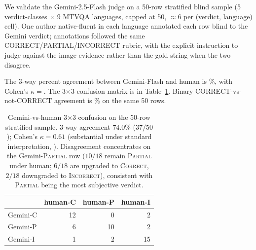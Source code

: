 We validate the Gemini-2.5-Flash judge on a 50-row stratified blind sample (5 verdict-classes $\times$ 9 MTVQA languages, capped at 50, $\approx 6$ per (verdict, language) cell). One author native-fluent in each language annotated each row blind to the Gemini verdict; annotations followed the same CORRECT/PARTIAL/INCORRECT rubric, with the explicit instruction to judge against the image evidence rather than the gold string when the two disagree.

The 3-way percent agreement between Gemini-Flash and human is \hjpct\%, with Cohen's $\kappa = $\hjkappa{}. The 3$\times$3 confusion matrix is in Table~\ref{tab:judge-confusion}. Binary CORRECT-vs-not-CORRECT agreement is \hjbinpct\% on the same 50 rows.

\begin{table}[t]
\centering
\small
\begin{tabular}{lrrr}
\toprule
& human-C & human-P & human-I \\
\midrule
Gemini-C & 12 & 0 & 2 \\
Gemini-P & 6 & 10 & 2 \\
Gemini-I & 1 & 2 & 15 \\
\bottomrule
\end{tabular}
\caption{Gemini-vs-human 3$\times$3 confusion on the 50-row stratified sample. 3-way agreement $74.0\%$ ($37/50$); Cohen's $\kappa = 0.61$ (substantial under standard interpretation, \citealp{landis1977kappa}). Disagreement concentrates on the Gemini-\textsc{Partial} row ($10/18$ remain \textsc{Partial} under human; $6/18$ are upgraded to \textsc{Correct}, $2/18$ downgraded to \textsc{Incorrect}), consistent with \textsc{Partial} being the most subjective verdict.}
\label{tab:judge-confusion}
\end{table}

